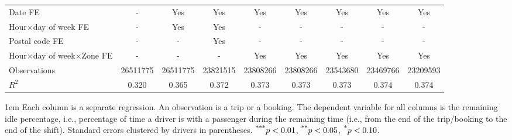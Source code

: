 \documentclass[reviewmode]{restat}
\begin{document}
\begin{appendices}
\begin{table}[h]
{\begin{minipage}{18cm}
{\begin{tabular}{l*{8}{c}}
				\addlinespace
				Date FE           &       {-}         &       {Yes}         &       {Yes}         &       {Yes}         &       {Yes}         &       {Yes}         &       {Yes}         &       {Yes}         \\
				\addlinespace
				Hour\(\times\)day of week FE&         {-}         &       {Yes}         &       {Yes}         &         {-}         &         {-}         &         {-}         &         {-}         &         {-}         \\
				\addlinespace
				Postal code FE      &         {-}         &         {-}         &       {Yes}         &         {-}         &         {-}         &         {-}         &         {-}         &         {-}         \\
				\addlinespace
				Hour\(\times\)day of week\(\times\)Zone FE&         {-}         &         {-}         &         {-}         &       {Yes}         &       {Yes}         &       {Yes}         &       {Yes}         &       {Yes}         \\
				\addlinespace
				Observations        &\num{26511775}         &\num{26511775}         &\num{23821515}         &\num{23808266}         &\num{23808266}         &\num{23543680}         &\num{23469766}         &\num{23209593}         \\
				$R^2$             &     {0.320}         &     {0.365}         &     {0.372}         &     {0.373}         &     {0.373}         &     {0.373}         &     {0.374}         &     {0.374}         \\
				\bottomrule
				\end{tabular}
				}
 			\begin{tablenotes}
 				\parindent 1em%
	        	\small
 				Each column is a separate regression. An observation is a trip or a booking. The dependent variable for all columns is the remaining idle percentage, i.e., percentage of time a driver is with a passenger during the remaining time (i.e., from the end of the trip/booking to the end of the shift). Standard errors clustered by drivers in parentheses. $\textsuperscript{***}p < 0.01$, $\textsuperscript{**}p < 0.05$, $\textsuperscript{*}p < 0.10$.  
 			\end{tablenotes}
 		   \end{minipage}%
    }  %
 	\end{table}
\FloatBarrier


\end{appendices}
\end{document}
